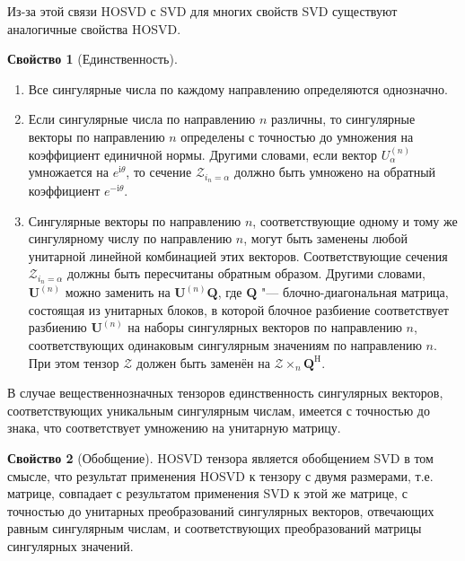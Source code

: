 \documentclass[specialist,
  substylefile = spbu.rtx,
subf,href,colorlinks=true, 12pt]{disser}
\theoremstyle{plain}
\theoremstyle{definition}
\newtheorem{property}{Свойство}[section]
\theoremstyle{remark}
\newcommand{\iu}{\mathrm{i}}
\begin{document}
Из-за этой связи HOSVD с SVD для многих свойств SVD существуют
аналогичные свойства HOSVD.
\begin{property}[Единственность]
  \leavevmode
  \begin{enumerate}
    \item Все сингулярные числа по каждому направлению определяются
      однозначно.
    \item Если сингулярные числа по направлению $n$ различны, то
      сингулярные векторы по направлению $n$ определены
      с точностью до умножения на коэффициент единичной нормы.
      Другими словами, если вектор $U_\alpha^{(n)}$ умножается на
      $e^{\iu\theta}$, то
      сечение $\mathcal{Z}_{i_n=\alpha}$ должно быть умножено на обратный
      коэффициент $e^{-\iu\theta}$.
    \item Сингулярные векторы по направлению $n$, соответствующие
      одному и тому же сингулярному числу по направлению $n$, могут
      быть заменены любой унитарной линейной комбинацией этих векторов.
      Соответствующие сечения $\mathcal{Z}_{i_n=\alpha}$ должны быть
      пересчитаны обратным образом.
      Другими словами, $\mathbf{U}^{(n)}$ можно заменить на
      $\mathbf{U}^{(n)}\mathbf{Q}$,
      где $\mathbf{Q}$ "--- блочно-диагональная матрица, состоящая из
      унитарных блоков, в которой блочное
      разбиение соответствует разбиению $\mathbf{U}^{(n)}$
      на наборы сингулярных векторов по направлению $n$,
      соответствующих одинаковым сингулярным значениям
      по направлению $n$.
      При этом тензор $\mathcal{Z}$ должен быть заменён на
      $\mathcal{Z}\times_{n} \mathbf{Q}^{\mathrm{H}}$.
  \end{enumerate}
  В случае вещественнозначных тензоров единственность сингулярных
  векторов, соответствующих уникальным сингулярным числам, имеется с
  точностью до знака, что соответствует умножению на унитарную матрицу.
\end{property}

\begin{property}[Обобщение]
  HOSVD тензора является обобщением SVD в том смысле, что
  результат применения HOSVD к тензору с двумя размерами, т.е.
  матрице, совпадает
  с результатом применения SVD к этой же матрице, с точностью до
  унитарных преобразований сингулярных векторов,
  отвечающих равным сингулярным числам, и соответствующих преобразований
  матрицы сингулярных значений.
\end{property}
\end{document}
